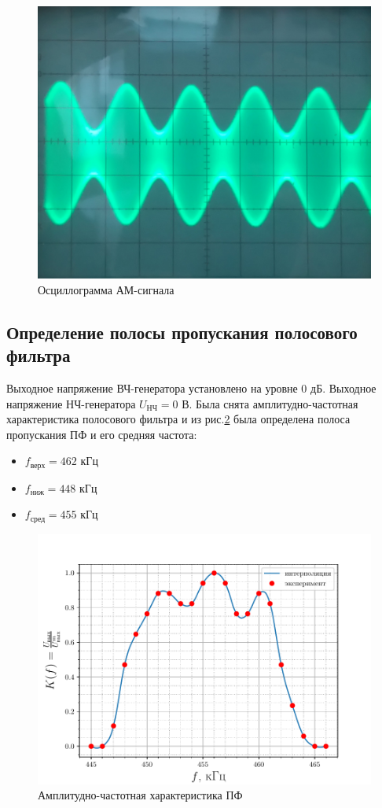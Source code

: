 \begin{figure}[H]
	\centering
	\includegraphics[width=0.7\linewidth]{img/img1}
	\caption{Осциллограмма АМ-сигнала}
	\label{fig:rec2}
\end{figure}


\subsection{Определение полосы пропускания полосового фильтра}
Выходное напряжение ВЧ-генератора установлено на уровне 0 дБ. Выходное напряжение НЧ-генератора $U_{\text{НЧ}}=0$ В.
Была снята амплитудно-частотная характеристика полосового фильтра и из рис.\ref{fig:rec1} была определена полоса пропускания ПФ и его средняя частота:

\begin{itemize}
	\item $f_{\text{верх}}=462$ кГц
	\item $f_{\text{ниж}}=448$ кГц
	\item $f_{\text{сред}}=455$ кГц
\end{itemize}

\begin{figure}[H]
	\centering
	\includegraphics[width=0.7\linewidth]{fig/task1}
	\caption{Амплитудно-частотная характеристика ПФ}
	\label{fig:rec1}
\end{figure}


